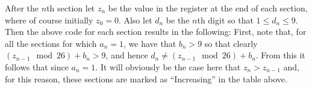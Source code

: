 \documentclass{article}
\begin{document}
{    After the $n$th section let $z_n$ be the value in the  register at the end of each section, where of course initially $z_0 = 0$.
    Also let $d_n$ be the $n$th digit so that $1 \leq d_n \leq 9$.
    Then the above code for each section results in the following:
    First, note that, for all the sections for which $a_n = 1$, we have that $b_n > 9$ so that clearly $(z_{n-1} \mod 26) + b_n > 9$, and hence $d_n \neq (z_{n-1} \mod 26) + b_n$.
    From this it follows that
    since $a_n = 1$.
    It will obviously be the case here that $z_n > z_{n-1}$ and, for this reason, these sections are marked as ``Increasing'' in the table above.

}
\end{document}
